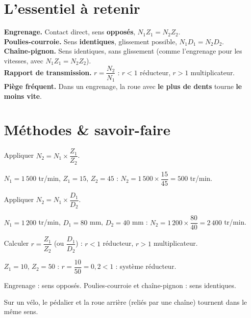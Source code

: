 \section{L'essentiel à retenir}

\begin{synthese}
\textbf{Engrenage.} Contact direct, sens \textbf{opposés}, $N_1Z_1=N_2Z_2$.\\[4pt]
\textbf{Poulies-courroie.} Sens \textbf{identiques}, glissement possible,
$N_1D_1=N_2D_2$.\\[4pt]
\textbf{Chaîne-pignon.} Sens identiques, sans glissement (comme l'engrenage pour les
vitesses, avec $N_1Z_1=N_2Z_2$).\\[4pt]
\textbf{Rapport de transmission.} $r=\dfrac{N_2}{N_1}$ : $r<1$ réducteur, $r>1$
multiplicateur.\\[4pt]
\textbf{Piège fréquent.} Dans un engrenage, la roue avec \textbf{le plus de dents} tourne
\textbf{le moins vite}.
\end{synthese}

\section{Méthodes \& savoir-faire}

Appliquer $N_2=N_1\times\dfrac{Z_1}{Z_2}$.
\begin{exemple}
$N_1=1\,500$ tr/min, $Z_1=15$, $Z_2=45$ : $N_2=1\,500\times\dfrac{15}{45}=500$ tr/min.
\end{exemple}

Appliquer $N_2=N_1\times\dfrac{D_1}{D_2}$.
\begin{exemple}
$N_1=1\,200$ tr/min, $D_1=80$ mm, $D_2=40$ mm : $N_2=1\,200\times\dfrac{80}{40}=2\,400$
tr/min.
\end{exemple}

Calculer $r=\dfrac{Z_1}{Z_2}$ (ou $\dfrac{D_1}{D_2}$) : $r<1$ réducteur, $r>1$
multiplicateur.
\begin{exemple}
$Z_1=10$, $Z_2=50$ : $r=\dfrac{10}{50}=0{,}2<1$ : système réducteur.
\end{exemple}

Engrenage : sens opposés. Poulies-courroie et chaîne-pignon : sens identiques.
\begin{exemple}
Sur un vélo, le pédalier et la roue arrière (reliés par une chaîne) tournent dans le même
sens.
\end{exemple}

